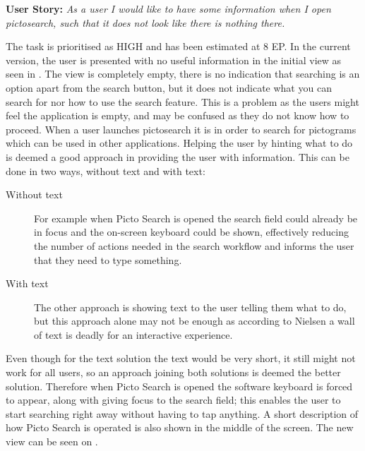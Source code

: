 \textbf{User Story:} \textit{As a user I would like to have some information when I open pictosearch, such that it does not look like there is nothing there.} \newline

The task is prioritised as HIGH and has been estimated at 8 EP.
In the current version, the user is presented with no useful information in the initial view as seen in . 
The view is completely empty, there is no indication that searching is an option apart from the search button, but it does not indicate what you can search for nor how to use the search feature.
This is a problem as the users might feel the application is empty, and may be confused as they do not know how to proceed.
When a user launches pictosearch it is in order to search for pictograms which can be used in other applications.
Helping the user by hinting what to do is deemed a good approach in providing the user with information.
This can be done in two ways, without text and with text:
\begin{description}
    \item [Without text]
    For example when Picto Search is opened the search field could already be in focus and the on-screen keyboard could be shown, effectively reducing the number of actions needed in the search workflow and informs the user that they need to type something.
    \item [With text] 
    The other approach is showing text to the user telling them what to do, but this approach alone may not be enough as according to Nielsen \cite{nielsen2003usability} a wall of text is deadly for an interactive experience.
\end{description}

Even though for the text solution the text would be very short, it still might not work for all users, so an approach joining both solutions is deemed the better solution.
Therefore when Picto Search is opened the software keyboard is forced to appear, along with giving focus to the search field; this enables the user to start searching right away without having to tap anything.
A short description of how Picto Search is operated is also shown in the middle of the screen.
The new view can be seen on .